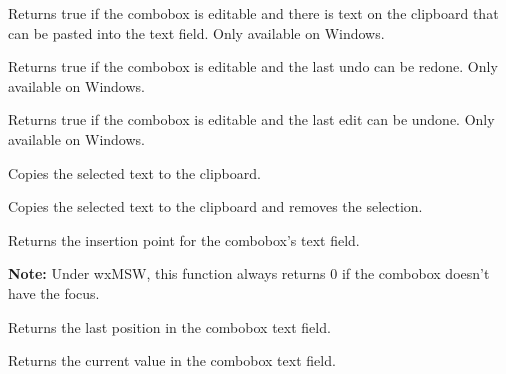 \label{wxcomboboxcanpaste}


Returns true if the combobox is editable and there is text on the clipboard that can be pasted into the
text field. Only available on Windows.


\label{wxcomboboxcanredo}


Returns true if the combobox is editable and the last undo can be redone.
Only available on Windows.


\label{wxcomboboxcanundo}


Returns true if the combobox is editable and the last edit can be undone.
Only available on Windows.


\label{wxcomboboxcopy}


Copies the selected text to the clipboard.


\label{wxcomboboxcut}


Copies the selected text to the clipboard and removes the selection.


\label{wxcomboboxgetinsertionpoint}


Returns the insertion point for the combobox's text field.

\textbf{Note:} Under wxMSW, this function always returns $0$ if the combobox
doesn't have the focus.


\label{wxcomboboxgetlastposition}


Returns the last position in the combobox text field.


\label{wxcomboboxgetvalue}


Returns the current value in the combobox text field.


\label{wxcomboboxpaste}

